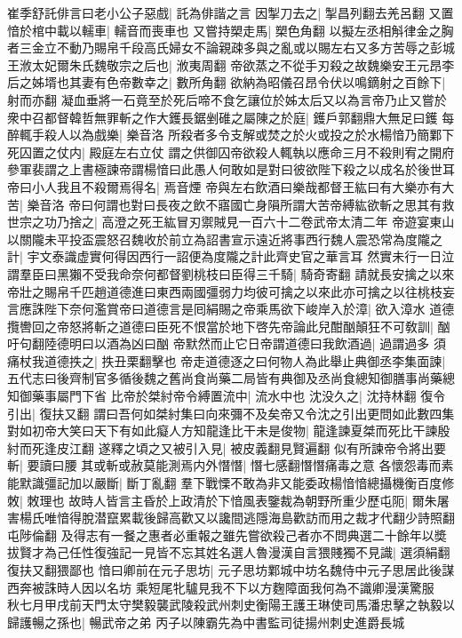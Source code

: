 崔季舒託俳言曰老小公子惡戲|{
	託為俳諧之言}
因掣刀去之|{
	掣昌列翻去羌呂翻}
又置愔於棺中載以轜車|{
	轜音而喪車也}
又嘗持槊走馬|{
	槊色角翻}
以擬左丞相斛律金之胸者三金立不動乃賜帛千段高氏婦女不論親疎多與之亂或以賜左右又多方苦辱之彭城王浟太妃爾朱氏魏敬宗之后也|{
	浟夷周翻}
帝欲蒸之不從手刃殺之故魏樂安王元昂李后之姊壻也其妻有色帝數幸之|{
	數所角翻}
欲納為昭儀召昂令伏以鳴鏑射之百餘下|{
	射而亦翻}
凝血垂將一石竟至於死后啼不食乞讓位於姊太后又以為言帝乃止又嘗於衆中召都督韓哲無罪斬之作大鑊長鋸剉碓之屬陳之於庭|{
	鑊戶郭翻鼎大無足曰鑊}
每醉輒手殺人以為戲樂|{
	樂音洛}
所殺者多令支解或焚之於火或投之於水楊愔乃簡鄴下死囚置之仗内|{
	殿庭左右立仗}
謂之供御囚帝欲殺人輒執以應命三月不殺則宥之開府參軍裴謂之上書極諫帝謂楊愔曰此愚人何敢如是對曰彼欲陛下殺之以成名於後世耳帝曰小人我且不殺爾焉得名|{
	焉音煙}
帝與左右飲酒曰樂哉都督王紘曰有大樂亦有大苦|{
	樂音洛}
帝曰何謂也對曰長夜之飲不寤國亡身隕所謂大苦帝縛紘欲斬之思其有救世宗之功乃捨之|{
	高澄之死王紘冒刃禦賊見一百六十二卷武帝太清二年}
帝遊宴東山以關隴未平投盃震怒召魏收於前立為詔書宣示遠近將事西行魏人震恐常為度隴之計|{
	宇文泰識虚實何得因西行一詔便為度隴之計此齊史官之華言耳}
然實未行一日泣謂羣臣曰黑獺不受我命奈何都督劉桃枝曰臣得三千騎|{
	騎奇寄翻}
請就長安擒之以來帝壯之賜帛千匹趙道德進曰東西兩國彊弱力均彼可擒之以來此亦可擒之以往桃枝妄言應誅陛下奈何濫賞帝曰道德言是囘絹賜之帝乘馬欲下峻岸入於漳|{
	欲入漳水}
道德攬轡回之帝怒將斬之道德曰臣死不恨當於地下啓先帝論此兒酣酗顛狂不可敎訓|{
	酗吁句翻陸德明曰以酒為凶曰酗}
帝默然而止它日帝謂道德曰我飲酒過|{
	過謂過多}
須痛杖我道德抶之|{
	抶丑栗翻擊也}
帝走道德逐之曰何物人為此舉止典御丞李集面諫|{
	五代志曰後齊制官多循後魏之舊尚食尚藥二局皆有典御及丞尚食總知御膳事尚藥總知御藥事屬門下省}
比帝於桀紂帝令縛置流中|{
	流水中也}
沈没久之|{
	沈持林翻}
復令引出|{
	復扶又翻}
謂曰吾何如桀紂集曰向來彌不及矣帝又令沈之引出更問如此數四集對如初帝大笑曰天下有如此癡人方知龍逢比干未是俊物|{
	龍逢諫夏桀而死比干諫殷紂而死逢皮江翻}
遂釋之頃之又被引入見|{
	被皮義翻見賢遍翻}
似有所諫帝令將出要斬|{
	要讀曰腰}
其或斬或赦莫能測焉内外憯憯|{
	憯七感翻憯憯痛毒之意}
各懷怨毒而素能默識彊記加以嚴斷|{
	斷丁亂翻}
羣下戰慄不敢為非又能委政楊愔愔總攝機衡百度修敇|{
	敇理也}
故時人皆言主昏於上政清於下愔風表鑒裁為朝野所重少歷屯阨|{
	爾朱屠害楊氏唯愔得脫潜竄累載後歸高歡又以讒間逃隱海島歡訪而用之裁才代翻少詩照翻屯陟倫翻}
及得志有一餐之惠者必重報之雖先嘗欲殺己者亦不問典選二十餘年以奬拔賢才為己任性復強記一見皆不忘其姓名選人魯漫漢自言猥賤獨不見識|{
	選須絹翻復扶又翻猥鄙也}
愔曰卿前在元子思坊|{
	元子思坊鄴城中坊名魏侍中元子思居此後謀西奔被誅時人因以名坊}
乘短尾牝驢見我不下以方麴障面我何為不識卿漫漢驚服　秋七月甲戌前天門太守樊毅襲武陵殺武州刺史衡陽王護王琳使司馬潘忠擊之執毅以歸護暢之孫也|{
	暢武帝之弟}
丙子以陳霸先為中書監司徒揚州刺史進爵長城

